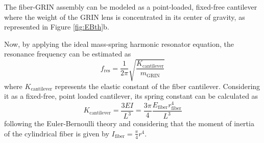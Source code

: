The fiber-GRIN assembly can be modeled as a point-loaded, fixed-free cantilever where the weight of the GRIN lens is concentrated in its center of gravity, as represented in Figure \ref{fig:EBth}b. 

Now, by applying the ideal mass-spring harmonic resonator equation, the resonance frequency can be estimated as 
\begin{equation}
f_\mathrm{res} = \frac{1}{2 \pi} \sqrt{\frac{K_\mathrm{cantilever}}{m_{\mathrm{GRIN}}}} 
\label{eq:fres}
\end{equation}
where $K_\mathrm{cantilever}$ represents the elastic constant of the fiber cantilever. Considering it as a fixed-free, point loaded cantilever, its spring constant can be calculated as 
\begin{equation}
K_\mathrm{cantilever} = \frac{3 E I}{L^3} = \frac{3 \pi}{4} \frac{E_\mathrm{fiber} r_\mathrm{fiber}^4}{L^3}
\label{eq:EB}
\end{equation}
following the Euler-Bernoulli theory \cite{MarcJ.Madou2011} and considering that the moment of inertia of the cylindrical fiber is given by $I_\mathrm{fiber} = \frac{\pi}{4} r^4$. 
